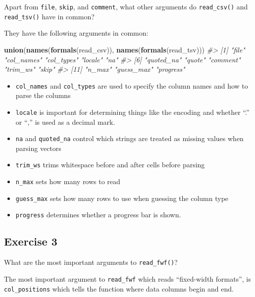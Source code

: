\documentclass[]{book}
\newenvironment{Shaded}{\begin{snugshade}}{\end{snugshade}}
\newcommand{\CommentTok}[1]{\textcolor[rgb]{0.56,0.35,0.01}{\textit{#1}}}
\newcommand{\KeywordTok}[1]{\textcolor[rgb]{0.13,0.29,0.53}{\textbf{#1}}}
\newcommand{\NormalTok}[1]{#1}
\providecommand{\tightlist}{%
  \setlength{\itemsep}{0pt}\setlength{\parskip}{0pt}}
\theoremstyle{plain}
\theoremstyle{remark}
\theoremstyle{definition}
\theoremstyle{definition}
\theoremstyle{definition}
\theoremstyle{remark}
\begin{document}
Apart from \texttt{file}, \texttt{skip}, and \texttt{comment}, what
other arguments do \texttt{read\_csv()} and \texttt{read\_tsv()} have in
common?

They have the following arguments in common:

\begin{Shaded}
\begin{Highlighting}[]
\KeywordTok{union}\NormalTok{(}\KeywordTok{names}\NormalTok{(}\KeywordTok{formals}\NormalTok{(read_csv)), }\KeywordTok{names}\NormalTok{(}\KeywordTok{formals}\NormalTok{(read_tsv)))}
\CommentTok{#>  [1] "file"      "col_names" "col_types" "locale"    "na"       }
\CommentTok{#>  [6] "quoted_na" "quote"     "comment"   "trim_ws"   "skip"     }
\CommentTok{#> [11] "n_max"     "guess_max" "progress"}
\end{Highlighting}
\end{Shaded}

\begin{itemize}
\tightlist
\item
  \texttt{col\_names} and \texttt{col\_types} are used to specify the
  column names and how to parse the columns
\item
  \texttt{locale} is important for determining things like the encoding
  and whether ``.'' or ``,'' is used as a decimal mark.
\item
  \texttt{na} and \texttt{quoted\_na} control which strings are treated
  as missing values when parsing vectors
\item
  \texttt{trim\_ws} trims whitespace before and after cells before
  parsing
\item
  \texttt{n\_max} sets how many rows to read
\item
  \texttt{guess\_max} sets how many rows to use when guessing the column
  type
\item
  \texttt{progress} determines whether a progress bar is shown.
\end{itemize}

\hypertarget{exercise-3-16}{%
\subsection{Exercise 3}\label{exercise-3-16}}

What are the most important arguments to \texttt{read\_fwf()}?

The most important argument to \texttt{read\_fwf} which reads
``fixed-width formats'', is \texttt{col\_positions} which tells the
function where data columns begin and end.
\end{document}
